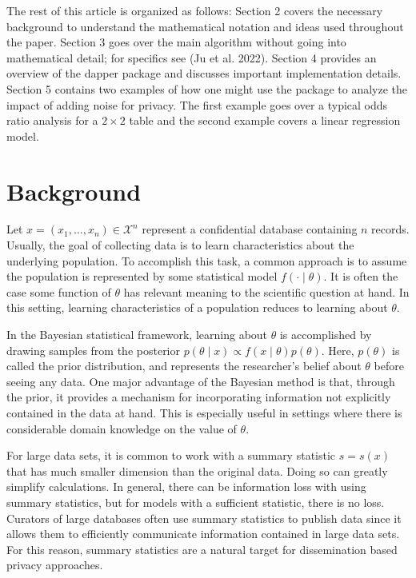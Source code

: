 The rest of this article is organized as follows: Section 2 covers the necessary background to understand the mathematical notation
and ideas used throughout the paper. Section 3 goes over the main algorithm without
going into mathematical detail; for specifics see (Ju et al. 2022). Section 4 provides
an overview of the dapper package and discusses important implementation details.
Section 5 contains two examples of how one might use the package to analyze the
impact of adding noise for privacy. The first example goes over a typical
odds ratio analysis for a \(2 \times 2\) table and the second example
covers a linear regression model.

\hypertarget{background}{%
\section{Background}\label{background}}

Let \(x = (x_1, \ldots, x_n) \in \mathcal{X}^n\) represent a confidential
database containing \(n\) records. Usually, the goal of collecting data
is to learn characteristics about the underlying population.
To accomplish this task, a common approach is to assume the population
is represented by some statistical model \(f( \cdot \mid \theta)\). It is often the case
some function of \(\theta\) has relevant meaning to the scientific question at hand. In this setting,
learning characteristics of a population reduces to learning about \(\theta\).

In the Bayesian statistical framework, learning about \(\theta\) is accomplished by drawing samples from the
posterior \(p(\theta \mid x) \propto f(x \mid \theta) p(\theta)\).
Here, \(p(\theta)\) is called the prior distribution, and represents
the researcher's belief about \(\theta\) before seeing any data.
One major advantage of the Bayesian method is that, through the prior,
it provides a mechanism for incorporating information not explicitly contained
in the data at hand. This is especially useful in settings where there
is considerable domain knowledge on the value of \(\theta\).

For large data sets, it is common to work with a summary statistic \(s = s(x)\)
that has much smaller dimension than the original data. Doing so can
greatly simplify calculations. In general, there can be information
loss with using summary statistics, but for models with a sufficient
statistic, there is no loss. Curators of large databases
often use summary statistics to publish data since it allows them
to efficiently communicate information contained in large data sets.
For this reason, summary statistics are a natural target for
dissemination based privacy approaches.

